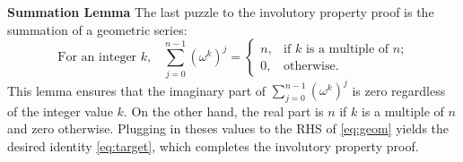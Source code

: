 \documentclass[12pt]{article}
\begin{document}
\noindent\textbf{\textsf{Summation Lemma}}\quad
The last puzzle to the involutory property proof is the summation
of a geometric series:
\begin{equation*}
  \text{For an integer $k$,}\quad
  \sum_{j=0}^{n-1}(\omega^k)^j = 
  \begin{cases}
    n, & \text{if $k$ is a multiple of $n$;} \\
    0, & \text{otherwise.}
  \end{cases}
\end{equation*}
This lemma ensures that the imaginary part of $\sum_{j=0}^{n-1}(\omega^k)^j$ is
zero regardless of the integer value $k$. On the other hand,
the real part is $n$ if $k$ is a multiple of $n$ and zero otherwise.
Plugging in theses values to the RHS of \eqref{eq:geom} yields the desired
identity \eqref{eq:target}, which completes the involutory property proof.
\end{document}
